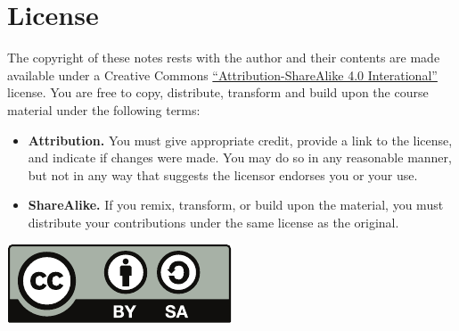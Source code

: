 \chapter*{License}%
\label{cha:license}

The copyright of these notes rests with the author and
their contents are made available under a Creative Commons
\href{https://creativecommons.org/licenses/by-sa/4.0/}{``Attribution-ShareAlike 4.0 Interational''}
license.
You are free to copy, distribute, transform and build upon the course material under the following terms:
\begin{itemize}
    \item \textbf{Attribution.}
    You must give appropriate credit, provide a link to the license, and indicate if changes were made.
    You may do so in any reasonable manner, but not in any way that suggests the licensor endorses you or your use.
    \item \textbf{ShareAlike.} If you remix, transform, or build upon the material,
        you must distribute your contributions under the same license as the original.
\end{itemize}

\vspace{1cm}
\hfill \includegraphics[scale=.7]{figures/cc-by-sa.pdf}
